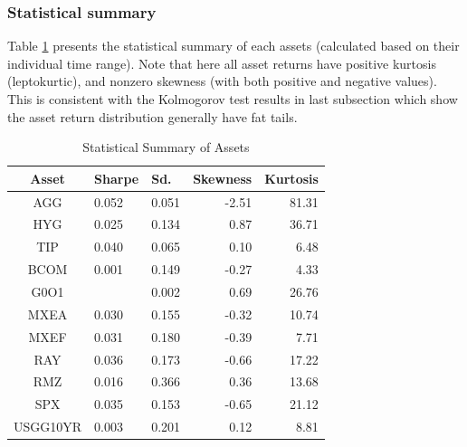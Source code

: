 \fi

\subsubsection{Statistical summary}

Table \ref{table:statSum} presents the statistical summary of each assets (calculated based on their individual time range). Note that here all asset returns have positive kurtosis (leptokurtic), and nonzero skewness (with both positive and negative values). This is consistent with the Kolmogorov test results in last subsection which show the asset return distribution generally have fat tails.

\begin{table}[!h]
\caption{Statistical Summary of Assets} 
\centering 
\begin{tabular}{ | c || p{1.5cm} p{1.2cm} r r | } 
 \hline
Asset & Sharpe  & Sd. & Skewness & Kurtosis \\
  \hline \hline
AGG & 0.052 & 0.051 & -2.51 & 81.31\\ 
HYG & 0.025 & 0.134 &  0.87 & 36.71\\ 
TIP & 0.040 & 0.065 &  0.10 &  6.48\\ 
BCOM & 0.001 & 0.149 & -0.27 &  4.33\\ 
G0O1 & & 0.002 &  0.69 & 26.76\\ 
MXEA & 0.030 & 0.155 & -0.32 & 10.74\\ 
MXEF & 0.031 & 0.180 & -0.39 &  7.71\\ 
RAY & 0.036 & 0.173 & -0.66 & 17.22\\ 
RMZ & 0.016 & 0.366 &  0.36 & 13.68\\ 
SPX & 0.035 & 0.153 & -0.65 & 21.12\\ 
USGG10YR & 0.003 & 0.201 &  0.12 &  8.81\\
 \hline
\end{tabular}
\label{table:statSum}
\end{table}